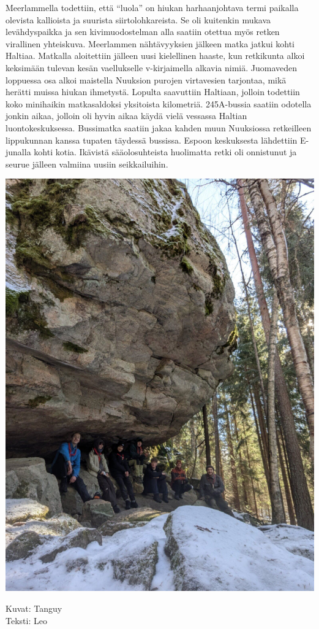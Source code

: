 \begin{multicols}{2}
Meerlammella todettiin, että “luola” on hiukan harhaanjohtava termi paikalla
olevista kallioista ja suurista siirtolohkareista. Se oli kuitenkin mukava
levähdyspaikka ja sen kivimuodostelman alla saatiin otettua myös retken
virallinen yhteiskuva. Meerlammen nähtävyyksien jälkeen matka jatkui kohti
Haltiaa. Matkalla aloitettiin jälleen uusi kielellinen haaste, kun retkikunta
alkoi keksimään tulevan kesän vaellukselle v-kirjaimella alkavia nimiä.
Juomaveden loppuessa osa alkoi maistella Nuuksion purojen virtavesien
tarjontaa, mikä herätti muissa hiukan ihmetystä. Lopulta saavuttiin Haltiaan,
jolloin todettiin koko minihaikin matkasaldoksi yksitoista kilometriä.
245A-bussia saatiin odotella jonkin aikaa, jolloin oli hyvin aikaa käydä vielä
vessassa Haltian luontokeskuksessa. Bussimatka saatiin jakaa kahden muun
Nuuksiossa retkeilleen lippukunnan kanssa tupaten täydessä bussissa. Espoon
keskuksesta lähdettiin E-junalla kohti kotia. Ikävistä sääolosuhteista
huolimatta retki oli onnistunut ja seurue jälleen valmiina uusiin
seikkailuihin.
\columnbreak

\noindent\includegraphics[width=1.2\linewidth,trim={4cm 0 6cm 0},clip]{assets/minihaikki7}

\end{multicols}


\vspace{1cm}
\noindent\null\hfill Kuvat: Tanguy\\
\noindent\null\hfill Teksti: Leo
